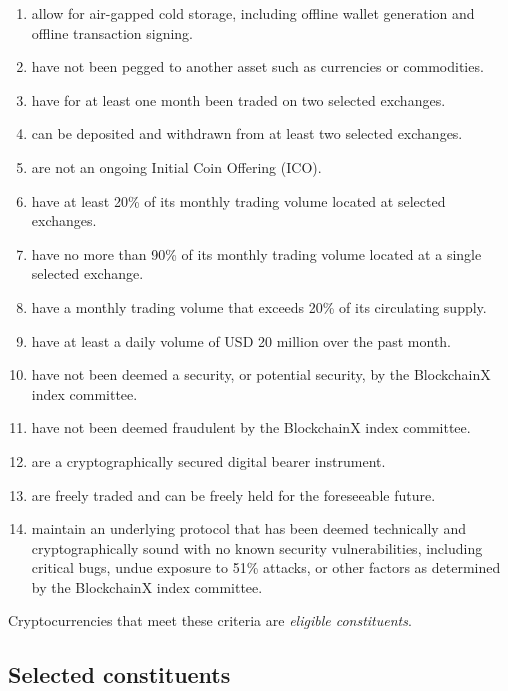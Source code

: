 \documentclass{article}
\begin{document}
\begin{enumerate}
\item allow for air-gapped cold storage, including offline wallet generation and offline transaction signing.
\item have not been pegged to another asset such as currencies or commodities.
\item have for at least one month been traded on two selected exchanges.
\item can be deposited and withdrawn from at least two selected exchanges.
\item are not an ongoing Initial Coin Offering (ICO).
\item have at least 20\% of its monthly trading volume located at selected exchanges.
\item have no more than 90\% of its monthly trading volume located at a single selected exchange.
\item have a monthly trading volume that exceeds 20\% of its circulating supply. 
\item have at least a daily volume of USD 20 million over the past month. 
\item have not been deemed a security, or potential security, by the BlockchainX index committee.
\item have not been deemed fraudulent by the BlockchainX index committee.
\item are a cryptographically secured digital bearer instrument.
\item are freely traded and can be freely held for the foreseeable future.
\item maintain an underlying protocol that has been deemed technically and cryptographically sound with no known security vulnerabilities, including critical bugs, undue exposure to 51\% attacks, or other factors as determined by the BlockchainX index committee.
\end{enumerate}

Cryptocurrencies that meet these criteria are \textit{eligible constituents}. 




\subsection{Selected constituents}
\end{document}
